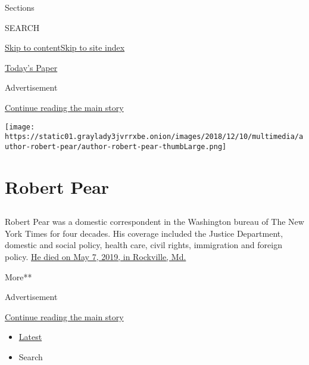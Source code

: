 Sections

SEARCH

\protect\hyperlink{site-content}{Skip to
content}\protect\hyperlink{site-index}{Skip to site index}

\href{https://myaccount.nytimes3xbfgragh.onion/auth/login?response_type=cookie\&client_id=vi}{}

\href{https://www.nytimes3xbfgragh.onion/section/todayspaper}{Today's
Paper}

Advertisement

\protect\hyperlink{after-top}{Continue reading the main story}

\texttt{[image: https://static01.graylady3jvrrxbe.onion/images/2018/12/10/multimedia/author-robert-pear/author-robert-pear-thumbLarge.png]}

\hypertarget{robert-pear}{%
\section{Robert Pear}\label{robert-pear}}

\subsection{}

Robert Pear was a domestic correspondent in the Washington bureau of The
New York Times for four decades. His coverage included the Justice
Department, domestic and social policy, health care, civil rights,
immigration and foreign policy.
\href{https://www.nytimes3xbfgragh.onion/2019/05/08/obituaries/robert-pear-dead-new-york-times.html}{He
died on May 7, 2019, in Rockville, Md.}

More**

Advertisement

\protect\hyperlink{after-mid1}{Continue reading the main story}

\begin{itemize}
\tightlist
\item
  \protect\hyperlink{stream-panel}{Latest}
\item
  Search
\end{itemize}

